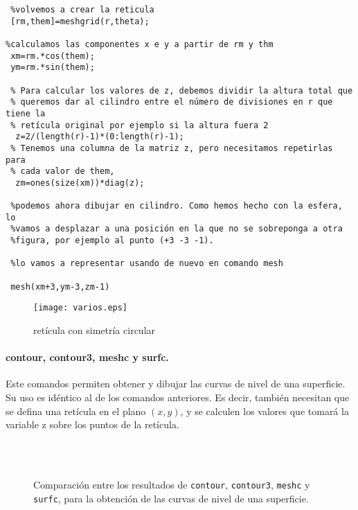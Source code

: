 \begin{verbatim}
 %volvemos a crear la reticula
 [rm,them]=meshgrid(r,theta);

%calculamos las componentes x e y a partir de rm y thm
 xm=rm.*cos(them);
 ym=rm.*sin(them);
 
 % Para calcular los valores de z, debemos dividir la altura total que
 % queremos dar al cilindro entre el número de divisiones en r que tiene la
 % retícula original por ejemplo si la altura fuera 2
  z=2/(length(r)-1)*(0:length(r)-1);
 % Tenemos una columna de la matriz z, pero necesitamos repetirlas para
 % cada valor de them,
  zm=ones(size(xm))*diag(z);
 
 %podemos ahora dibujar en cilindro. Como hemos hecho con la esfera, lo
 %vamos a desplazar a una posición en la que no se sobreponga a otra
 %figura, por ejemplo al punto (+3 -3 -1).
 
 %lo vamos a representar usando de nuevo en comando mesh
 
 mesh(xm+3,ym-3,zm-1)

\end{verbatim}

\begin{figure}[h]
\centering
\texttt{[image: varios.eps]}
\caption{retícula con simetría circular}
\label{fig:varios}
\end{figure}

\paragraph{contour, contour3, meshc y surfc.} Este comandos permiten obtener y dibujar las curvas de nivel de una superficie. Su uso es idéntico al de los comandos anteriores. Es decir, también necesitan que se defina una retícula en el plano $(x,y)$, y se calculen los valores que tomará  la variable z sobre los puntos de la retícula.

\begin{figure}[h]
\centering
{} \qquad 
{}\\
\qquad
{}\\
\caption{Comparación entre los resultados de \texttt{contour}, \texttt{contour3}, \texttt{meshc} y \texttt{surfc}, para la obtención de las curvas de nivel de una superficie. }
\end{figure}

